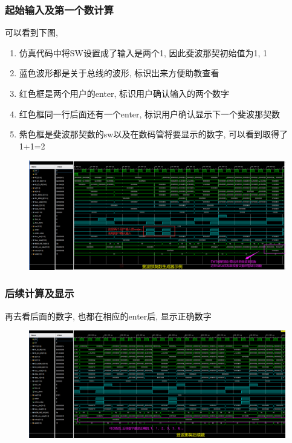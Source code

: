 \documentclass[UTF8]{article}
\begin{document}
\subsubsection{起始输入及第一个数计算}
可以看到下图,
\begin{enumerate}
	\item 仿真代码中将SW设置成了输入是两个1, 因此斐波那契初始值为1, 1
	\item 蓝色波形都是关于总线的波形, 标识出来方便助教查看
	\item 红色框是两个用户的enter, 标识用户确认输入的两个数字
	\item 红色框同一行后面还有一个enter, 标识用户确认显示下一个斐波那契数
	\item 紫色框是斐波那契数的sw以及在数码管将要显示的数字, 可以看到取得了1+1=2
\end{enumerate}
\begin{figure}[H]
	\centering
	\includegraphics[width=\linewidth]{fibonacci_sample.png}
	\label{fibonacci_sample}
\end{figure}
\subsubsection{后续计算及显示}
再去看后面的数字, 也都在相应的enter后, 显示正确数字
\begin{figure}[H]
	\centering
	\includegraphics[width=\linewidth]{fibonacci_sequence.png}
	\label{fibonacci_sequence}
\end{figure}
\end{document}
